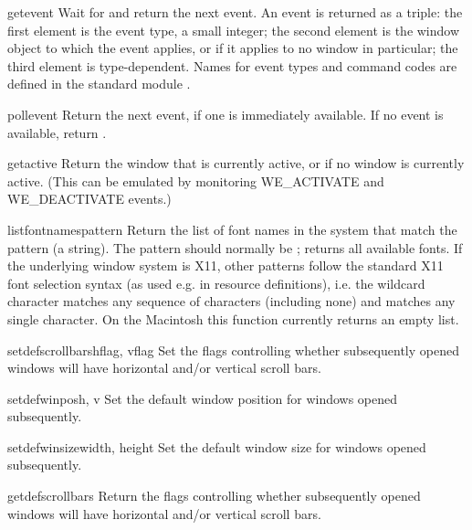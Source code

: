 \begin{funcdesc}{getevent}{}
Wait for and return the next event.
An event is returned as a triple: the first element is the event
type, a small integer; the second element is the window object to which
the event applies, or
if it applies to no window in particular;
the third element is type-dependent.
Names for event types and command codes are defined in the standard
module
.
\end{funcdesc}

\begin{funcdesc}{pollevent}{}
Return the next event, if one is immediately available.
If no event is available, return \code{()}.
\end{funcdesc}

\begin{funcdesc}{getactive}{}
Return the window that is currently active, or  if no
window is currently active.  (This can be emulated by monitoring
WE_ACTIVATE and WE_DEACTIVATE events.)
\end{funcdesc}

\begin{funcdesc}{listfontnames}{pattern}
Return the list of font names in the system that match the pattern (a
string).  The pattern should normally be ; returns all
available fonts.  If the underlying window system is X11, other
patterns follow the standard X11 font selection syntax (as used e.g.
in resource definitions), i.e. the wildcard character 
matches any sequence of characters (including none) and 
matches any single character.
On the Macintosh this function currently returns an empty list.
\end{funcdesc}

\begin{funcdesc}{setdefscrollbars}{hflag, vflag}
Set the flags controlling whether subsequently opened windows will
have horizontal and/or vertical scroll bars.
\end{funcdesc}

\begin{funcdesc}{setdefwinpos}{h, v}
Set the default window position for windows opened subsequently.
\end{funcdesc}

\begin{funcdesc}{setdefwinsize}{width, height}
Set the default window size for windows opened subsequently.
\end{funcdesc}

\begin{funcdesc}{getdefscrollbars}{}
Return the flags controlling whether subsequently opened windows will
have horizontal and/or vertical scroll bars.
\end{funcdesc}

